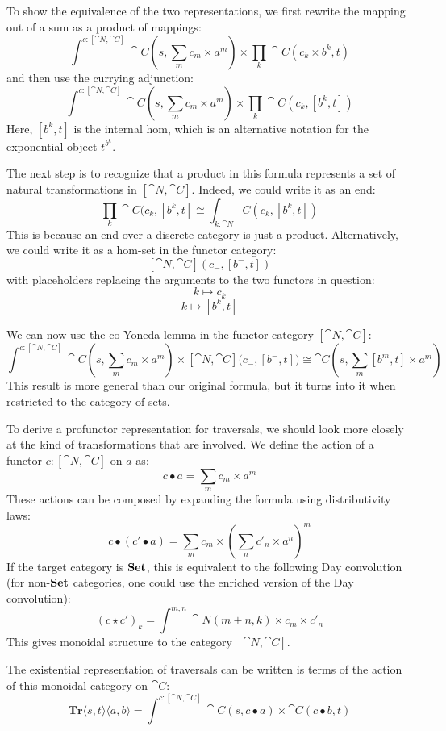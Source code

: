 \documentclass[DaoFP]{subfiles}
\begin{document}
To show the equivalence of the two representations, we first rewrite the mapping out of a sum as a product of mappings:
\[\int^{c \colon [\cat N, \cat C]} \cat C (s, \sum_m c_m \times a^m) \times \prod_k \cat C (c_k \times b^k, t) \]
and then use the currying adjunction:
\[\int^{c \colon [\cat N, \cat C]} \cat C (s, \sum_m c_m \times a^m) \times \prod_k \cat C (c_k,  [b^k, t]) \]
Here, $[b^k, t]$ is the internal hom, which is an alternative notation for the exponential object $t^{b^k}$.

The next step is to recognize that a product in this formula represents a set of natural transformations in $[\cat N, \cat C]$. Indeed, we could write it as an end:
 \[ \prod_k \cat C (c_k,  [b^k, t] \cong \int_{k : \cat N} C (c_k,  [b^k, t]) \]
This is because an end over a discrete category is just a product. Alternatively, we could write it as a hom-set in the functor category:
\[ [\cat N, \cat C](c_{-}, [b^{-}, t]) \]
with placeholders replacing the arguments to the two functors in question:
\[ k \mapsto c_k \]
\[ k \mapsto [b^k, t] \]

We can now use the co-Yoneda lemma in the functor category $[\cat N, \cat C]$:
\[\int^{c \colon [\cat N, \cat C]} \cat C (s, \sum_m c_m \times a^m) \times  [\cat N, \cat C]\big(c_{-}, [b^{-}, t]\big) \cong \cat C(s, \sum_m [b^m, t] \times a^m)\]
This result is more general than our original formula, but it turns into it when restricted to the category of sets.

To derive a profunctor representation for traversals, we should look more closely at the kind of transformations that are involved. We define the action of a functor $c \colon [\cat N, \cat C]$ on $a$ as:
\[ c \bullet a = \sum_m c_m \times a^m \]
These actions can be composed by expanding the formula using distributivity laws:
\[ c \bullet (c' \bullet a) = \sum_m c_m \times (\sum_n c'_n \times a^n)^m \]
If the target category is $\mathbf{Set}$, this is equivalent to the following Day convolution (for non-$\mathbf{Set}$ categories, one could use the enriched version of the Day convolution):
\[ (c \star c')_k = \int^{m, n} \cat N (m + n, k) \times c_m \times c'_n \]
This gives monoidal structure to the category $[\cat N, \cat C]$. 

The existential representation of traversals can be written is terms of the action of this monoidal category on $\cat C$:
\[ \mathbf{Tr} \langle s, t\rangle \langle a, b \rangle = \int^{c \colon [\cat N, \cat C]} \cat C (s, c \bullet a) \times \cat C (c \bullet b, t) \]
\end{document}
